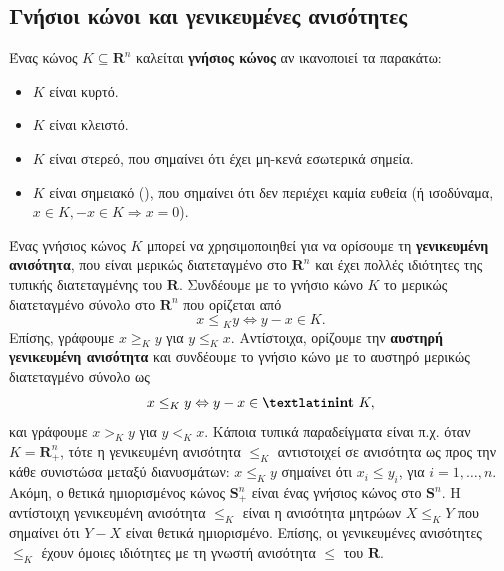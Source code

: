 \subsection{Γνήσιοι κώνοι και γενικευμένες ανισότητες} Ένας κώνος $K \subseteq
\mathbf{R}^n$ καλείται \textbf{γνήσιος κώνος} αν ικανοποιεί τα παρακάτω:
\begin{itemize}
    \item $K$ είναι κυρτό.
    \item $K$ είναι κλειστό.
    \item $K$ είναι στερεό, που σημαίνει ότι έχει μη-κενά εσωτερικά σημεία.
    \item $K$ είναι σημειακό (), που σημαίνει ότι δεν περιέχει καμία
        ευθεία (ή ισοδύναμα, $x \in K, -x \in K \Rightarrow x = 0$).
\end{itemize}
Ένας γνήσιος κώνος $K$ μπορεί να χρησιμοποιηθεί για να ορίσουμε τη
\textbf{γενικευμένη ανισότητα}, που είναι μερικώς διατεταγμένο στο
$\mathbf{R}^n$ και έχει πολλές ιδιότητες της τυπικής διατεταγμένης του
$\mathbf{R}$. Συνδέουμε με το γνήσιο κώνο $K$ το μερικώς διατεταγμένο σύνολο στο
$\mathbf{R}^n$ που ορίζεται από
\begin{equation*}
    x \leq {}_Ky \Leftrightarrow y - x \in K.
\end{equation*}
Επίσης, γράφουμε $x \geq_Ky$ για $y \leq_K x$. Αντίστοιχα, ορίζουμε την
\textbf{αυστηρή γενικευμένη ανισότητα} και συνδέουμε το γνήσιο κώνο με το
αυστηρό μερικώς διατεταγμένο σύνολο ως
\begin{equation*}
    x \leq_Ky \Leftrightarrow y - x \in \textbf{\tl{int}}\ K,
\end{equation*}
και γράφουμε $x >_K y$ για $y <_K x$. Κάποια τυπικά παραδείγματα είναι π.χ.
όταν $K = \mathbf{R}_+^n$, τότε η γενικευμένη ανισότητα $\leq_K$ αντιστοιχεί
σε ανισότητα ως προς την κάθε συνιστώσα μεταξύ διανυσμάτων: $x \leq_K y$
σημαίνει ότι $x_i \leq y_i$, για $i = 1, \dots, n$. Ακόμη, ο θετικά
ημιορισμένος κώνος $\mathbf{S}^n_+$ είναι ένας γνήσιος κώνος στο $\mathbf{S}^n$.
Η αντίστοιχη γενικευμένη ανισότητα $\leq_K$ είναι η ανισότητα μητρώων
$X \leq_K Y$ που σημαίνει ότι $Y - X$ είναι θετικά ημιορισμένο. Επίσης, οι
γενικευμένες ανισότητες $\leq_K$ έχουν όμοιες ιδιότητες με τη γνωστή ανισότητα
$\leq$ του $\mathbf{R}$.

